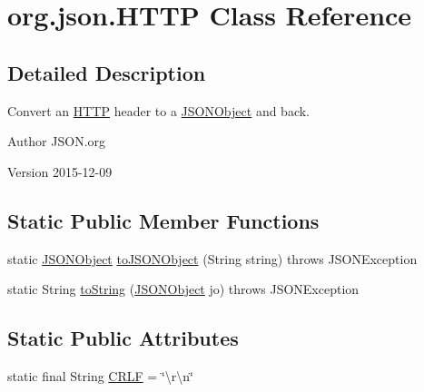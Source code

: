\hypertarget{classorg_1_1json_1_1HTTP}{\section{org.\-json.\-H\-T\-T\-P Class Reference}
\label{classorg_1_1json_1_1HTTP}
}


\subsection{Detailed Description}
Convert an \hyperlink{classorg_1_1json_1_1HTTP}{H\-T\-T\-P} header to a \hyperlink{classorg_1_1json_1_1JSONObject}{J\-S\-O\-N\-Object} and back. \begin{DoxyAuthor}{Author}
J\-S\-O\-N.\-org 
\end{DoxyAuthor}
\begin{DoxyVersion}{Version}
2015-\/12-\/09 
\end{DoxyVersion}
\subsection*{Static Public Member Functions}
\begin{DoxyCompactItemize}
\item 
static \hyperlink{classorg_1_1json_1_1JSONObject}{J\-S\-O\-N\-Object} \hyperlink{classorg_1_1json_1_1HTTP_a9ac2cf295e6a84bfeed1af10dc9dae33}{to\-J\-S\-O\-N\-Object} (String string)  throws J\-S\-O\-N\-Exception 
\item 
static String \hyperlink{classorg_1_1json_1_1HTTP_aee0416336b82e1c7c7941350a2a409d7}{to\-String} (\hyperlink{classorg_1_1json_1_1JSONObject}{J\-S\-O\-N\-Object} jo)  throws J\-S\-O\-N\-Exception 
\end{DoxyCompactItemize}
\subsection*{Static Public Attributes}
\begin{DoxyCompactItemize}
\item 
static final String \hyperlink{classorg_1_1json_1_1HTTP_a7feb3304ccde0415ee29b8f997fb65b6}{C\-R\-L\-F} = \char`\"{}\textbackslash{}r\textbackslash{}n\char`\"{}
\end{DoxyCompactItemize}


